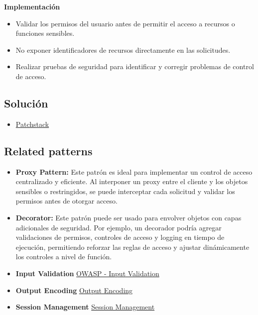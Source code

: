 \textbf{Implementación} \begin{itemize} \item Validar los permisos del usuario antes de permitir el acceso a recursos o funciones sensibles. \item No exponer identificadores de recursos directamente en las solicitudes. \item Realizar pruebas de seguridad para identificar y corregir problemas de control de acceso. \end{itemize}

\subsection{Solución}

\begin{itemize}
    \item \href{https://patchstack.com/academy/wordpress/securing-code/broken-access-control/}{Patchstack}
\end{itemize}

\subsection{Related patterns}

\begin{itemize} 
\item \textbf{Proxy Pattern: }Este patrón es ideal para implementar un control de acceso centralizado y eficiente. Al interponer un proxy entre el cliente y los objetos sensibles o restringidos, se puede interceptar cada solicitud y validar los permisos antes de otorgar acceso.
\item \textbf{Decorator: }Este patrón puede ser usado para envolver objetos con capas adicionales de seguridad. Por ejemplo, un decorador podría agregar validaciones de permisos, controles de acceso y logging en tiempo de ejecución, permitiendo reforzar las reglas de acceso y ajustar dinámicamente los controles a nivel de función.
\item \textbf{Input Validation} 
\href{https://cheatsheetseries.owasp.org/cheatsheets/Input_Validation_Cheat_Sheet.html}{OWASP - Input Validation}
\item \textbf{Output Encoding}
\href{https://qwiet.ai/appsec-101-output-encoding/}{Output Encoding}
\item \textbf{Session Management}
\href{https://cheatsheetseries.owasp.org/cheatsheets/Session_Management_Cheat_Sheet.html}{Session Management}
\end{itemize}